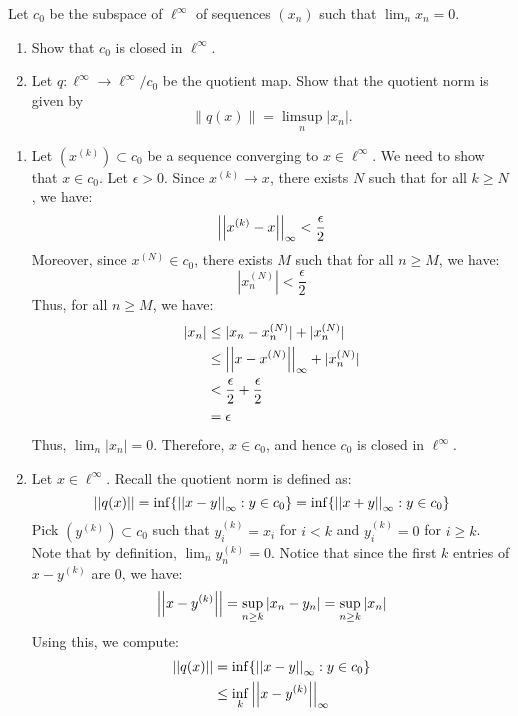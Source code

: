 \documentclass[12pt]{article}
\begin{document}
\begin{problem}{4}
    Let $c_0$ be the subspace of $\ell^\infty$ of sequences $(x_n)$ such that $\lim_n x_n = 0$.
    \begin{enumerate}
        \item Show that $c_0$ is closed in $\ell^\infty$.
        \item Let $q : \ell^\infty \to \ell^\infty / c_0$ be the quotient map. Show that the quotient norm is given by
        \[
        \|q(x)\| = \limsup_n |x_n|.
        \]
    \end{enumerate}
\end{problem}
\begin{solution}
    \bbni
    \begin{enumerate}
        \item Let $(x^{(k)}) \subset c_0$ be a sequence converging to $x \in \ell^\infty$. We need to show that $x \in c_0$. \bbni
        Let $\epsilon > 0$. Since $x^{(k)} \to x$, there exists $N$ such that for all $k \geq N$, we have:
        \[ \left\vert\left\vert x^{(k)} - x\right\vert\right\vert_\infty < \frac\epsilon 2\]
        Moreover, since $x^{(N)} \in c_0$, there exists $M$ such that for all $n \geq M$, we have: 
        \[ |x^{(N)}_n| < \frac\epsilon 2\]
        Thus, for all $n \geq M$, we have: 
        \begin{align*}
            |x_n| &\leq |x_n - x^{(N)}_n| + |x^{(N)}_n| \\
            &\leq \left\vert\left\vert x-x^{(N)}\right\vert\right\vert_\infty + |x^{(N)}_n| \\
            &< \frac\epsilon 2 + \frac\epsilon 2 \\
            &= \epsilon
        \end{align*}
        Thus, $\lim_n |x_n| = 0$. Therefore, $x \in c_0$, and hence $c_0$ is closed in $\ell^\infty$.
        \item Let $x \in \ell^\infty$. Recall the quotient norm is defined as: 
        \[ \left\vert\left\vert q(x)\right\vert\right\vert = \inf\{ \left\vert\left\vert x-y\right\vert\right\vert_\infty: y \in c_0 \} = \inf\{ \left\vert\left\vert x+y\right\vert\right\vert_\infty: y \in c_0 \}\]
        Pick $(y^{(k)}) \subset c_0$ such that $y_i^{(k)} = x_i$ for $i < k$ and $y_i^{(k)} = 0$ for $i \geq k$. Note that by definition, $\lim_n y^{(k)}_n = 0$. Notice that since the first $k$ entries of $x-y^{(k)}$ are $0$, we have:
        \[ \left\vert\left\vert x-y^{(k)}\right\vert\right\vert = \sup_{n\geq k} |x_n-y_n| = \sup_{n\geq k} |x_n|\]
        Using this, we compute: 
        \begin{align*}
            \norm{q(x)} &= \inf\{\norm{x-y}_\infty: y \in c_0\} \\
            &\leq \inf_k \norm{x-y^{(k)}}_\infty \\

\end{align*}
\end{enumerate}
\end{solution}
\end{document}
